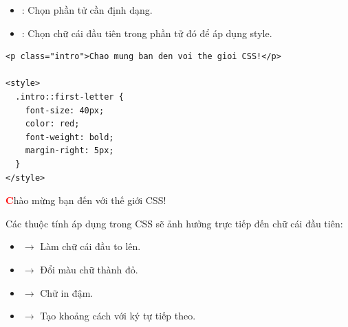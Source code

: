 \begin{conceptBox}
\begin{itemize}[leftmargin=1.5em, itemsep=3pt, parsep=0pt]
    \item {}: Chọn phần tử cần định dạng.
    \item {}: Chọn chữ cái đầu tiên trong phần tử đó để áp dụng style.
\end{itemize}
\end{conceptBox}

\begin{codeWindow}
\begin{lstlisting}[language=HTML5]
<p class="intro">Chao mung ban den voi the gioi CSS!</p>

<style>
  .intro::first-letter {
    font-size: 40px;
    color: red;
    font-weight: bold;
    margin-right: 5px;
  }
</style>
\end{lstlisting}
\end{codeWindow}

\begin{browserWindow}
\sffamily\small
\textbf{\Huge\textcolor{red}{C}}hào mừng bạn đến với thế giới CSS!
\end{browserWindow}

\begin{conceptBox}
Các thuộc tính áp dụng trong CSS sẽ ảnh hưởng trực tiếp đến chữ cái đầu tiên:
\begin{itemize}[leftmargin=1.5em, itemsep=3pt, parsep=0pt]
    \item {} $\rightarrow$ Làm chữ cái đầu to lên.
    \item {} $\rightarrow$ Đổi màu chữ thành đỏ.
    \item {} $\rightarrow$ Chữ in đậm.
    \item {} $\rightarrow$ Tạo khoảng cách với ký tự tiếp theo.
\end{itemize}
\end{conceptBox}

